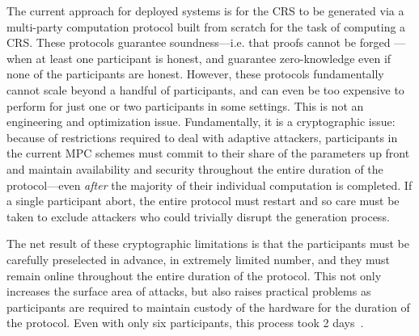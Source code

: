 \documentclass{article}
\begin{document}

The current approach for deployed systems is for the CRS to be generated via a  multi-party computation protocol\cite{BCGTV15,BGG17} built from scratch for the task of computing a CRS. These protocols guarantee soundness---i.e. that proofs cannot be forged ---when at least one participant is honest, and guarantee zero-knowledge even if none of the participants are honest.\cite{cryptoeprint:2017:587} However, these protocols fundamentally cannot scale beyond a handful of participants, and can even be too expensive to perform for just one or two participants in some settings. This is not an engineering and optimization issue. Fundamentally, it is a cryptographic issue: because of restrictions required to deal with adaptive attackers, participants in the current MPC schemes must commit to their share of the parameters up front and maintain availability and security throughout the entire duration of the protocol---even \emph{after} the majority of their individual computation is completed. If a single participant abort, the entire protocol must restart%
and so care must be taken to exclude attackers who could trivially disrupt the generation process.  


The net result of these cryptographic limitations is that the participants must be carefully preselected in advance,  in  extremely limited number, and  they must remain online throughout the entire duration of the protocol. This not only increases the surface area of attacks, but also raises practical problems as participants are required to maintain custody of the hardware for the duration of the protocol. Even with only  six participants, this process took 2 days~\cite{zcashCeremoney}.
\end{document}
